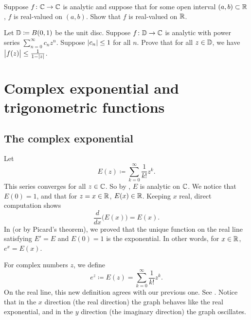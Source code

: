 \begin{exercise}
Suppose $f \colon {\mathbb{C}} \to {\mathbb{C}}$ is analytic and suppose that for some
open interval $(a,b) \subset {\mathbb{R}}$, $f$ is real-valued on $(a,b)$.  Show
that $f$ is real-valued on ${\mathbb{R}}$.
\end{exercise}

\begin{exercise}
Let ${\mathbb{D}} \coloneqq B(0,1)$ be the unit disc.  Suppose
$f \colon {\mathbb{D}} \to {\mathbb{C}}$ is analytic with power series
$\sum_{n=0}^\infty c_n z^n$.  Suppose $\lvert {c_n} \rvert \leq 1$ for all $n$.  Prove that for
all $z \in {\mathbb{D}}$, we have
$\bigl\lvert {f(z)} \bigr\rvert \leq \frac{1}{1-\lvert {z} \rvert}$.
\end{exercise}


\sectionnewpage
\section{Complex exponential and trigonometric functions}
\label{sec:complexexp}



\subsection{The complex exponential}

Let
\begin{equation*}
E(z) \coloneqq \sum_{k=0}^\infty \frac{1}{k!} z^k .
\end{equation*}
This series converges for all $z \in {\mathbb{C}}$.
So by
, $E$ is analytic on ${\mathbb{C}}$.   We notice that $E(0) = 1$,
and that for $z=x \in {\mathbb{R}}$, $E(x) \in {\mathbb{R}}$.  Keeping $x$ real, direct
computation shows
\begin{equation*}
\frac{d}{dx} \bigl( E(x) \bigr) = E(x) .
\end{equation*}
In  (or by Picard's theorem), we proved that
the unique function on the real line satisfying $E' = E$ and
$E(0) = 1$ is the exponential.  In other words, for $x \in {\mathbb{R}}$, $e^x = E(x)$.

For complex numbers $z$, we define
\begin{equation*}
e^z \coloneqq E(z) = 
\sum_{k=0}^\infty \frac{1}{k!} z^k .
\end{equation*}
On the real line, this new definition agrees with our previous one.
See .  Notice that in the $x$ direction
(the real direction)
the graph behaves like the real exponential, and in the $y$ direction
(the imaginary direction) the graph oscillates.

